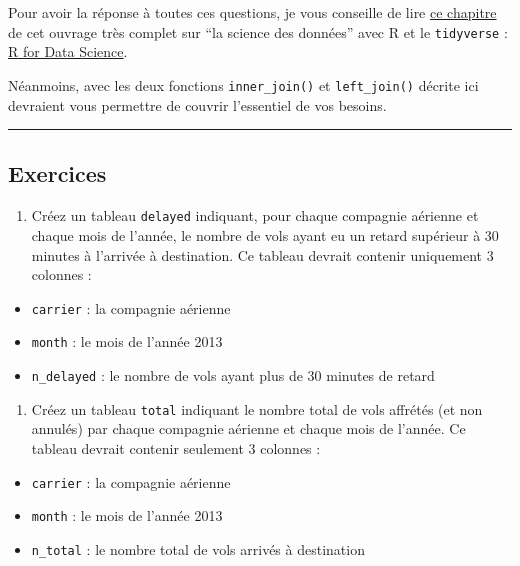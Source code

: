 \documentclass[a4paperpaper,]{article}
\providecommand{\tightlist}{%
  \setlength{\itemsep}{0pt}\setlength{\parskip}{0pt}}
\begin{document}
Pour avoir la réponse à toutes ces questions, je vous conseille de lire \href{http://r4ds.had.co.nz/relational-data.html}{ce chapitre} de cet ouvrage très complet sur ``la science des données'' avec R et le \texttt{tidyverse} : \href{http://r4ds.had.co.nz}{R for Data Science}.

Néanmoins, avec les deux fonctions \texttt{inner\_join()} et \texttt{left\_join()} décrite ici devraient vous permettre de couvrir l'essentiel de vos besoins.

\begin{center}\rule{0.5\linewidth}{\linethickness}\end{center}

\hypertarget{exercices-11}{%
\subsection{Exercices}\label{exercices-11}}

\begin{enumerate}
\def\labelenumi{\arabic{enumi}.}
\tightlist
\item
  Créez un tableau \texttt{delayed} indiquant, pour chaque compagnie aérienne et chaque mois de l'année, le nombre de vols ayant eu un retard supérieur à 30 minutes à l'arrivée à destination. Ce tableau devrait contenir uniquement 3 colonnes :
\end{enumerate}

\begin{itemize}
\tightlist
\item
  \texttt{carrier} : la compagnie aérienne
\item
  \texttt{month} : le mois de l'année 2013
\item
  \texttt{n\_delayed} : le nombre de vols ayant plus de 30 minutes de retard
\end{itemize}

\begin{enumerate}
\def\labelenumi{\arabic{enumi}.}
\setcounter{enumi}{1}
\tightlist
\item
  Créez un tableau \texttt{total} indiquant le nombre total de vols affrétés (et non annulés) par chaque compagnie aérienne et chaque mois de l'année. Ce tableau devrait contenir seulement 3 colonnes :
\end{enumerate}

\begin{itemize}
\tightlist
\item
  \texttt{carrier} : la compagnie aérienne
\item
  \texttt{month} : le mois de l'année 2013
\item
  \texttt{n\_total} : le nombre total de vols arrivés à destination
\end{itemize}
\end{document}
